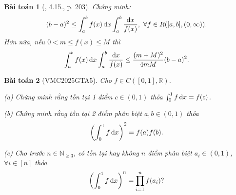 \documentclass{article}
\newtheorem{baitoan}{Bài toán}
\begin{document}
\begin{baitoan}[\cite{Quoc_Long_Dat_Nam_VMC}, 4.15., p. 203]
	Chứng minh:
	\begin{equation*}
		(b - a)^2\le\int_a^b f(x)\,{\rm d}x\int_a^b \frac{{\rm d}x}{f(x)},\ \forall f\in R([a,b],(0,\infty)).
	\end{equation*}
	Hơn nữa, nếu $0 < m\le f(x)\le M$ thì
	\begin{equation*}
		\int_a^b f(x)\,{\rm d}x\int_a^b \frac{{\rm d}x}{f(x)}\le\frac{(m + M)^2}{4mM}(b - a)^2.
	\end{equation*}
\end{baitoan}


\begin{baitoan}[VMC2025GTA5]
	Cho $f\in C([0,1],\mathbb{R})$.
	\item(a) Chứng minh rằng tồn tại 1 điểm $c\in(0,1)$ thỏa $\int_0^1 f\,{\rm d}x = f(c)$.
	\item(b) Chứng minh rằng tồn tại 2 điểm phân biệt $a,b\in(0,1)$ thỏa
	\begin{equation*}
		\left(\int_0^1 f\,{\rm d}x\right)^2 = f(a)f(b).
	\end{equation*}
	\item(c) Cho trước $n\in\mathbb{N}_{\ge3}$, có tồn tại hay không $n$ điểm phân biệt $a_i\in(0,1)$, $\forall i\in[n]$ thỏa
	\begin{equation*}
		\left(\int_0^1 f\,{\rm d}x\right)^n = \prod_{i=1}^n f(a_i)?
	\end{equation*}
\end{baitoan}
\end{document}
